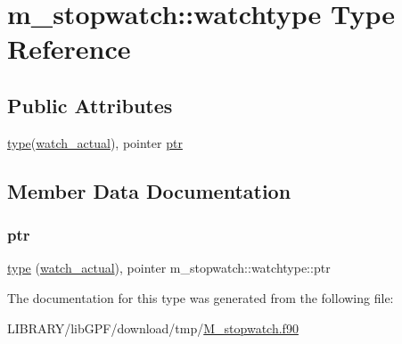 \hypertarget{structm__stopwatch_1_1watchtype}{}\section{m\+\_\+stopwatch\+:\+:watchtype Type Reference}
\label{structm__stopwatch_1_1watchtype}
\subsection*{Public Attributes}
\begin{DoxyCompactItemize}
\item 
\hyperlink{stop__watch_83_8txt_a70f0ead91c32e25323c03265aa302c1c}{type}(\hyperlink{structm__stopwatch_1_1watch__actual}{watch\+\_\+actual}), pointer \hyperlink{structm__stopwatch_1_1watchtype_abfd188f9a27ba289e623148a1bc1ddfa}{ptr}
\end{DoxyCompactItemize}


\subsection{Member Data Documentation}
\mbox{\label{structm__stopwatch_1_1watchtype_abfd188f9a27ba289e623148a1bc1ddfa}} 
\subsubsection{\texorpdfstring{ptr}{ptr}}
{\footnotesize\ttfamily \hyperlink{stop__watch_83_8txt_a70f0ead91c32e25323c03265aa302c1c}{type} (\hyperlink{structm__stopwatch_1_1watch__actual}{watch\+\_\+actual}), pointer m\+\_\+stopwatch\+::watchtype\+::ptr}



The documentation for this type was generated from the following file\+:\begin{DoxyCompactItemize}
\item 
L\+I\+B\+R\+A\+R\+Y/lib\+G\+P\+F/download/tmp/\hyperlink{M__stopwatch_8f90}{M\+\_\+stopwatch.\+f90}\end{DoxyCompactItemize}
